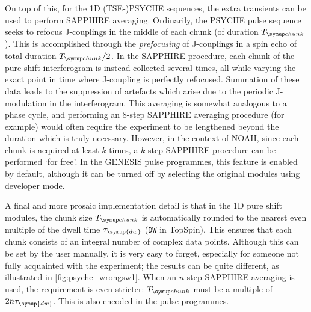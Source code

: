 On top of this, for the 1D (TSE-)PSYCHE sequences, the extra transients can be used to perform SAPPHIRE averaging\autocite{Moutzouri2017CC}.
Ordinarily, the PSYCHE pulse sequence seeks to refocus J-couplings in the middle of each chunk (of duration $\Tchunk$).
This is accomplished through the \textit{prefocusing} of J-couplings in a spin echo of total duration $\Tchunk/2$.\autocite{Aguilar2010ACIE}
In the SAPPHIRE procedure, each chunk of the pure shift interferogram is instead collected several times, all while varying the exact point in time where J-coupling is perfectly refocused.
Summation of these data leads to the suppression of artefacts which arise due to the periodic J-modulation in the interferogram.
This averaging is somewhat analogous to a phase cycle, and performing an 8-step SAPPHIRE averaging procedure (for example) would often require the experiment to be lengthened beyond the duration which is truly necessary.
However, in the context of NOAH, since each chunk is acquired at least $k$ times, a $k$-step SAPPHIRE procedure can be performed `for free'.
In the GENESIS pulse programmes, this feature is enabled by default, although it can be turned off by selecting the original modules using developer mode.

A final and more prosaic implementation detail is that in the 1D pure shift modules, the chunk size $\Tchunk$ is automatically rounded to the nearest even multiple of the dwell time $\tau_{\symup{dw}}$ (\texttt{DW} in TopSpin).
This ensures that each chunk consists of an integral number of complex data points.
Although this can be set by the user manually, it is very easy to forget, especially for someone not fully acquainted with the experiment; the results can be quite different, as illustrated in \cref{fig:psyche_wrongsw1}.
When an $n$-step SAPPHIRE averaging is used, the requirement is even stricter: $\Tchunk$ must be a multiple of $2n \tau_{\symup{dw}}$.
This is also encoded in the pulse programmes.
